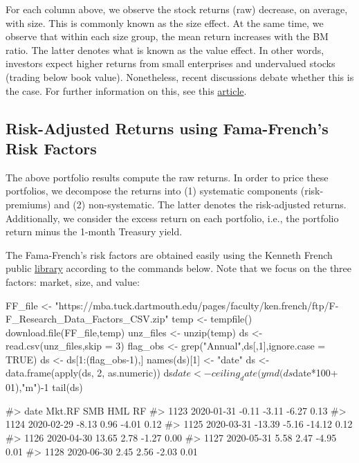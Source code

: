 For each column above, we observe the stock returns (raw) decrease, on
average, with size. This is commonly known as the size effect. At the
same time, we observe that within each size group, the mean return
increases with the BM ratio. The latter denotes what is known as the value
effect. In other words, investors expect higher returns from small
enterprises and undervalued stocks (trading below book value).
Nonetheless, recent discussions debate whether this is the case. For
further information on this, see this
\href{https://www.bloomberg.com/news/articles/2020-02-06/quant-pioneers-of-value-investing-are-trying-to-see-if-it-s-dead}{article}.

\hypertarget{risk-adjusted-returns-using-fama-french-risk-factors}{%
\subsection{Risk-Adjusted Returns using Fama-French's Risk
Factors}\label{risk-adjusted-returns-using-fama-french-risk-factors}}

The above portfolio results compute the raw returns. In order to price
these portfolios, we decompose the returns into (1) systematic components
(risk-premiums) and (2) non-systematic. The latter denotes the risk-adjusted
returns. Additionally, we consider the excess return on each portfolio,
i.e., the portfolio return minus the 1-month Treasury yield.

The Fama-French's risk factors are obtained easily using the Kenneth French
public \href{http://mba.tuck.dartmouth.edu/pages/faculty/ken.french/}{library} according to the commands below. Note that we focus on the
three factors: market, size, and value:

\begin{Schunk}
\begin{Sinput}
FF_file <- 
  "https://mba.tuck.dartmouth.edu/pages/faculty/ken.french/ftp/F-F_Research_Data_Factors_CSV.zip"
temp <- tempfile()
download.file(FF_file,temp)
unz_files <- unzip(temp)
ds <- read.csv(unz_files,skip = 3)
flag_obs <- grep("Annual",ds[,1],ignore.case = TRUE)
ds <- ds[1:(flag_obs-1),]
names(ds)[1] <- "date"
ds <- data.frame(apply(ds, 2, as.numeric))
ds$date <- ceiling_date(ymd(ds$date*100+ 01),"m")-1
tail(ds)
\end{Sinput}
\begin{Soutput}
#>            date Mkt.RF   SMB    HML   RF
#> 1123 2020-01-31  -0.11 -3.11  -6.27 0.13
#> 1124 2020-02-29  -8.13  0.96  -4.01 0.12
#> 1125 2020-03-31 -13.39 -5.16 -14.12 0.12
#> 1126 2020-04-30  13.65  2.78  -1.27 0.00
#> 1127 2020-05-31   5.58  2.47  -4.95 0.01
#> 1128 2020-06-30   2.45  2.56  -2.03 0.01
\end{Soutput}
\end{Schunk}

